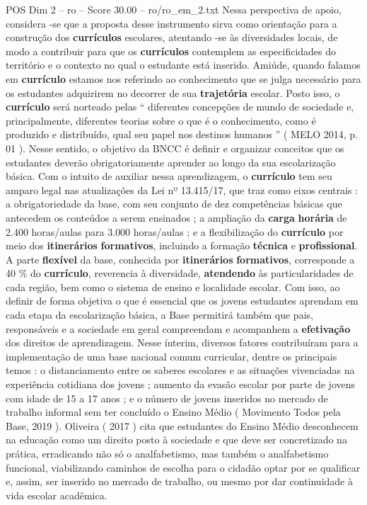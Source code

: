 \begin{textsample}{POS Dim 2 – ro – Score 30.00 – ro/ro\_em\_2.txt}
Nessa perspectiva de apoio, considera -se que a proposta desse instrumento sirva como orientação para a construção dos \textbf{currículos} escolares, atentando -se às diversidades locais, de modo a contribuir para que os \textbf{currículos} contemplem as especificidades do território e o contexto no qual o estudante está inserido.
Amiúde, quando falamos em \textbf{currículo} estamos nos referindo ao conhecimento que se julga necessário para os estudantes adquirirem no decorrer de sua \textbf{trajetória} escolar.
Posto isso, o \textbf{currículo} será norteado pelas “ diferentes concepções de mundo de sociedade e, principalmente, diferentes teorias sobre o que é o conhecimento, como é produzido e distribuído, qual seu papel nos destinos humanos ” ( MELO 2014, p. 01 ).
Nesse sentido, o objetivo da BNCC é definir e organizar conceitos que os estudantes deverão obrigatoriamente aprender ao longo da sua escolarização básica.
Com o intuito de auxiliar nessa aprendizagem, o \textbf{currículo} tem seu amparo legal nas atualizações da Lei nº 13.415/17, que traz como eixos centrais : a obrigatoriedade da base, com seu conjunto de dez competências básicas que antecedem os conteúdos a serem ensinados ; a ampliação da \textbf{carga} \textbf{horária} de 2.400 horas/aulas para 3.000 horas/aulas ; e a flexibilização do \textbf{currículo} por meio dos \textbf{itinerários} \textbf{formativos}, incluindo a formação \textbf{técnica} e \textbf{profissional}.
A parte \textbf{flexível} da base, conhecida por \textbf{itinerários} \textbf{formativos}, corresponde a 40 \% do \textbf{currículo}, reverencia à diversidade, \textbf{atendendo} às particularidades de cada região, bem como o sistema de ensino e localidade escolar.
Com isso, ao definir de forma objetiva o que é essencial que os jovens estudantes aprendam em cada etapa da escolarização básica, a Base permitirá também que pais, responsáveis e a sociedade em geral compreendam e acompanhem a \textbf{efetivação} dos direitos de aprendizagem.
Nesse ínterim, diversos fatores contribuíram para a implementação de uma base nacional comum curricular, dentre os principais temos : o distanciamento entre os saberes escolares e as situações vivenciadas na experiência cotidiana dos jovens ; aumento da evasão escolar por parte de jovens com idade de 15 a 17 anos ; e o número de jovens inseridos no mercado de trabalho informal sem ter concluído o Ensino Médio ( Movimento Todos pela Base, 2019 ).
Oliveira ( 2017 ) cita que estudantes do Ensino Médio desconhecem na educação como um direito posto à sociedade e que deve ser concretizado na prática, erradicando não só o analfabetismo, mas também o analfabetismo funcional, viabilizando caminhos de escolha para o cidadão optar por se qualificar e, assim, ser inserido no mercado de trabalho, ou mesmo por dar continuidade à vida escolar acadêmica.

\end{textsample}
